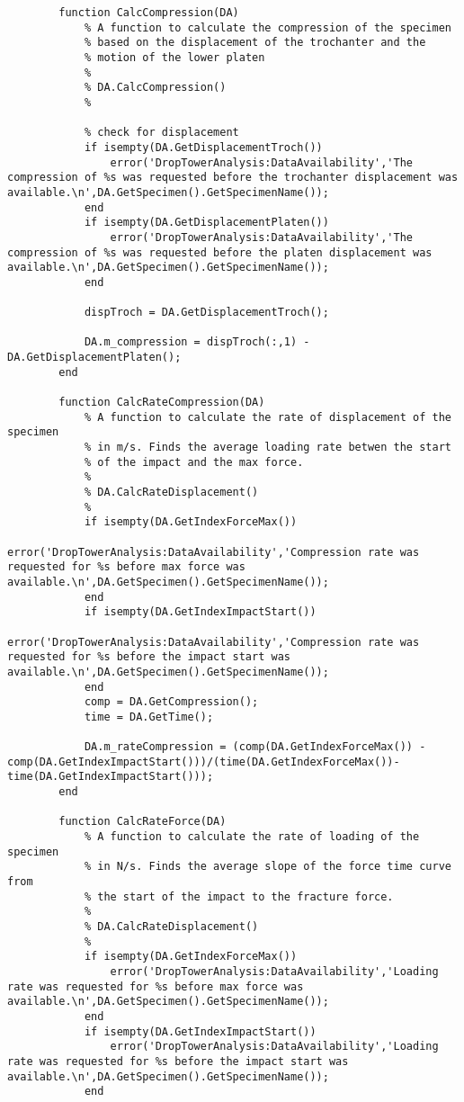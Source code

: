 \begin{lstlisting}
        function CalcCompression(DA)
            % A function to calculate the compression of the specimen
            % based on the displacement of the trochanter and the 
            % motion of the lower platen
            %
            % DA.CalcCompression()
            %
            
            % check for displacement
            if isempty(DA.GetDisplacementTroch())
                error('DropTowerAnalysis:DataAvailability','The compression of %s was requested before the trochanter displacement was available.\n',DA.GetSpecimen().GetSpecimenName());
            end
            if isempty(DA.GetDisplacementPlaten())
                error('DropTowerAnalysis:DataAvailability','The compression of %s was requested before the platen displacement was available.\n',DA.GetSpecimen().GetSpecimenName());
            end
            
            dispTroch = DA.GetDisplacementTroch();
            
            DA.m_compression = dispTroch(:,1) - DA.GetDisplacementPlaten();
        end
        
        function CalcRateCompression(DA)
            % A function to calculate the rate of displacement of the specimen
            % in m/s. Finds the average loading rate betwen the start
            % of the impact and the max force.
            %
            % DA.CalcRateDisplacement()
            %
            if isempty(DA.GetIndexForceMax())
                error('DropTowerAnalysis:DataAvailability','Compression rate was requested for %s before max force was available.\n',DA.GetSpecimen().GetSpecimenName());
            end
            if isempty(DA.GetIndexImpactStart())
                error('DropTowerAnalysis:DataAvailability','Compression rate was requested for %s before the impact start was available.\n',DA.GetSpecimen().GetSpecimenName());
            end
            comp = DA.GetCompression();
            time = DA.GetTime();
            
            DA.m_rateCompression = (comp(DA.GetIndexForceMax()) - comp(DA.GetIndexImpactStart()))/(time(DA.GetIndexForceMax())-time(DA.GetIndexImpactStart()));
        end
        
        function CalcRateForce(DA)
            % A function to calculate the rate of loading of the specimen
            % in N/s. Finds the average slope of the force time curve from
            % the start of the impact to the fracture force.
            %
            % DA.CalcRateDisplacement()
            %
            if isempty(DA.GetIndexForceMax())
                error('DropTowerAnalysis:DataAvailability','Loading rate was requested for %s before max force was available.\n',DA.GetSpecimen().GetSpecimenName());
            end
            if isempty(DA.GetIndexImpactStart())
                error('DropTowerAnalysis:DataAvailability','Loading rate was requested for %s before the impact start was available.\n',DA.GetSpecimen().GetSpecimenName());
            end
            

\end{lstlisting}
